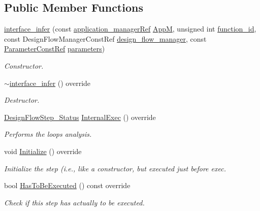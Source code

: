 \subsection*{Public Member Functions}
\begin{DoxyCompactItemize}
\item 
\hyperlink{classinterface__infer_abb5945f2271e5c1623f8a0059e8b4fd5}{interface\+\_\+infer} (const \hyperlink{application__manager_8hpp_a04ccad4e5ee401e8934306672082c180}{application\+\_\+manager\+Ref} \hyperlink{classFrontendFlowStep_a0ac0d8db2a378416583f51c4faa59d15}{AppM}, unsigned int \hyperlink{classFunctionFrontendFlowStep_a58ef2383ad1a212a8d3f396625a4b616}{function\+\_\+id}, const Design\+Flow\+Manager\+Const\+Ref \hyperlink{classDesignFlowStep_ab770677ddf087613add30024e16a5554}{design\+\_\+flow\+\_\+manager}, const \hyperlink{Parameter_8hpp_a37841774a6fcb479b597fdf8955eb4ea}{Parameter\+Const\+Ref} \hyperlink{classDesignFlowStep_a802eaafe8013df706370679d1a436949}{parameters})
\begin{DoxyCompactList}\small\item\em Constructor. \end{DoxyCompactList}\item 
\hyperlink{classinterface__infer_acc515495ed14927c97a9e414bfe97474}{$\sim$interface\+\_\+infer} () override
\begin{DoxyCompactList}\small\item\em Destructor. \end{DoxyCompactList}\item 
\hyperlink{design__flow__step_8hpp_afb1f0d73069c26076b8d31dbc8ebecdf}{Design\+Flow\+Step\+\_\+\+Status} \hyperlink{classinterface__infer_ac613f0dc15f8116799a922fc7fbd726a}{Internal\+Exec} () override
\begin{DoxyCompactList}\small\item\em Performs the loops analysis. \end{DoxyCompactList}\item 
void \hyperlink{classinterface__infer_a6d0b5cf326bca201100be4cb19f1a588}{Initialize} () override
\begin{DoxyCompactList}\small\item\em Initialize the step (i.\+e., like a constructor, but executed just before exec. \end{DoxyCompactList}\item 
bool \hyperlink{classinterface__infer_ad97e5d56a1e05d81ed97976e8e8382f7}{Has\+To\+Be\+Executed} () const override
\begin{DoxyCompactList}\small\item\em Check if this step has actually to be executed. \end{DoxyCompactList}\item 

\end{DoxyCompactItemize}
